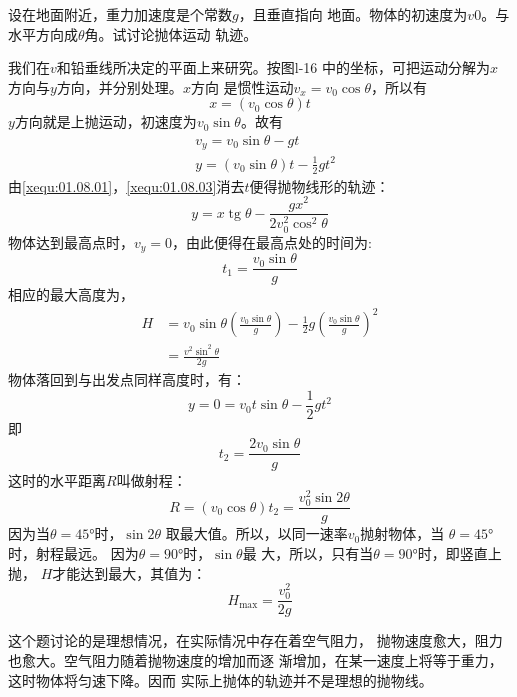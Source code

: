  设在地面附近，重力加速度是个常数$g$，且垂直指向
地面。物体的初速度为$ v0 $。与水平方向成$ \theta $角。试讨论抛体运动
轨迹。

\discussion 我们在$ v $和铅垂线所决定的平面上来研究。按图l-16
中的坐标，可把运动分解为$ x $方向与$ y $方向，并分别处理。$ x $方向
是惯性运动$ v_x=v_0\cos\theta $，所以有
\begin{equation*}\label{xequ:01.08.01}
    x=(v_0\cos\theta)t \tag{1}
\end{equation*}
$ y $方向就是上抛运动，初速度为$ v_0\sin\theta$。故有
\begin{align*}
\label{xequ:01.08.02} &v_y=v_0\sin\theta-gt \tag{2} \\
\label{xequ:01.08.03} &y=(v_0\sin\theta)t-\frac{1}{2}gt^2 \tag{3}
\end{align*}
由\eqref{xequ:01.08.01}，\eqref{xequ:01.08.03}消去$ t $便得抛物线形的轨迹：
\begin{equation*}\label{xequ:01.08.04}
    y=x \operatorname{tg} \theta-\frac{g x^{2}}{2 v_{0}^{2} \cos ^{2} \theta} \tag{4}
\end{equation*}
物体达到最高点时，$ v_y=0 $，由此便得在最高点处的时间为:
\begin{equation*}
    t_{1}=\frac{v_{0} \sin \theta}{g}
\end{equation*}
相应的最大高度为，
\begin{equation*}
    \begin{aligned}
        H &=v_{0} \sin \theta\left(\frac{v_{0} \sin \theta}{g}\right)-\frac{1}{2} g\left(\frac{v_{0} \sin \theta}{g}\right)^{2} \\
        &=\frac{v^{2} \sin ^{2} \theta}{2 g}
    \end{aligned}
\end{equation*}
物体落回到与出发点同样高度时，有：
\begin{equation*}
    y=0=v_{0} t \sin \theta-\frac{1}{2} g t^{2}
\end{equation*}
即\vspace{-1em}
\begin{equation*}
    t_{2}=\frac{2 v_{0} \sin \theta}{g}
\end{equation*}
这时的水平距离$R$叫做射程：
\begin{equation*}
    R=\left(v_{0} \cos \theta\right) t_{2}=\frac{v_{0}^{2} \sin 2 \theta}{g}
\end{equation*}
因为当$\theta=\ang{45;;}$时，$\sin2\theta$
取最大值。所以，以同一速率$v_0$抛射物体，当
$\theta=\ang{45;;}$时，射程最远。
因为$\theta=\ang{90;;}$时，$\sin\theta$最
大，所以，只有当$\theta=\ang{90;;}$时，即竖直上抛，
$H$才能达到最大，其值为：
\begin{equation*}
    H_{\max }=\frac{v_{0}^{2}}{2 g}
\end{equation*}

这个题讨论的是理想情况，在实际情况中存在着空气阻力，
抛物速度愈大，阻力也愈大。空气阻力随着抛物速度的增加而逐
渐增加，在某一速度上将等于重力，这时物体将匀速下降。因而
实际上抛体的轨迹并不是理想的抛物线。

